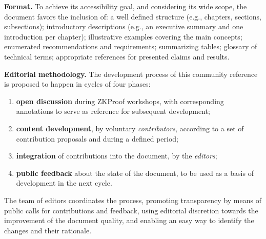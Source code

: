 \textbf{Format.}
	To achieve its accessibility goal, and considering its wide scope, the document favors the inclusion of: 
	a well defined structure (e.g., chapters, sections, subsections);
	introductory descriptions (e.g., an executive summary and one introduction per chapter); 
	illustrative examples covering the main concepts; 
	enumerated recommendations and requirements; 
	summarizing tables; 
	glossary of technical terms; 
	appropriate references for presented claims and results.


\textbf{Editorial methodology.}
	The development process of this community reference is proposed to happen in cycles of four phases:
	\begin{enumerate}[label=(\roman*),itemsep=0ex]
	\item \textbf{open discussion} during ZKProof workshops, with corresponding annotations to serve as reference for subsequent development;
	\item \textbf{content development}, by voluntary \emph{contributors}, according to a set of contribution proposals and during a defined period;
	\item \textbf{integration} of contributions into the document, by the \emph{editors}; 
	\item \textbf{public feedback} about the state of the document, to be used as a basis of development in the next cycle.
	\end{enumerate}
	The team of editors coordinates the process, 
promoting transparency by means of public calls for contributions and feedback, 
using editorial discretion towards the improvement of the document quality,
and enabling an easy way to identify the changes and their rationale.
